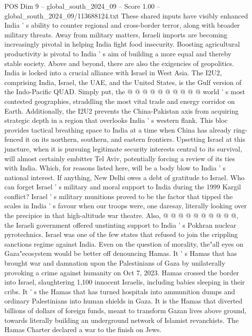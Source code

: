 \begin{textsample}{POS Dim 9 – global\_south\_2024\_09 – Score 1.00 – global\_south\_2024\_09/113688124.txt}
These shared inputs have visibly enhanced India ' s ability to counter regional and cross-border terror, along with broader military threats.
Away from military matters, Israeli imports are becoming increasingly pivotal in helping India fight food insecurity.
Boosting agricultural productivity is pivotal to India ' s aim of building a more equal and thereby stable society.
Above and beyond, there are also the exigencies of geopolitics.
India is locked into a crucial alliance with Israel in West Asia.
The I2U2, comprising India, Israel, the UAE, and the United States, is the Gulf version of the Indo-Pacific QUAD.
Simply put, the @ @ @ @ @ @ @ @ @ @ world ' s most contested geographies, straddling the most vital trade and energy corridor on Earth.
Additionally, the I2U2 prevents the China-Pakistan axis from acquiring strategic depth in a region that overlooks India ' s western flank.
This bloc provides tactical breathing space to India at a time when China has already ring-fenced it on its northern, southern, and eastern frontiers.
Upsetting Israel at this juncture, when it is pursuing legitimate security interests central to its survival, will almost certainly embitter Tel Aviv, potentially forcing a review of its ties with India.
Which, for reasons listed here, will be a body blow to India ' s national interest.
If anything, New Delhi owes a debt of gratitude to Israel.
Who can forget Israel ' s military and moral support to India during the 1999 Kargil conflict?
Israel ' s military munitions proved to be the factor that tipped the scales in India ' s favour when our troops were, one daresay, literally looking over the precipice in that high-altitude war theatre.
Also, @ @ @ @ @ @ @ @ @ @, the Israeli government offered unstinting support to India ' s Pokhran nuclear pyrotechnics.
Israel was one of the few states that refused to join the crippling sanctions regime against India.
Even on the question of morality, the"all eyes on Gaza"ecosystem would be better off denouncing Hamas.
It ' s Hamas that has brought war and damnation upon the Palestinians of Gaza by unilaterally provoking a crime against humanity on Oct 7, 2023.
Hamas crossed the border into Israel, slaughtering 1,100 innocent Israelis, including babies sleeping in their cribs.
It ' s the Hamas that has turned hospitals into ammunition dumps and ordinary Palestinians into human shields in Gaza.
It is the Hamas that diverted billions of dollars of foreign funds, meant to transform Gazan lives above ground, towards literally building an underground network of Islamist revanchists.
The Hamas Charter declared a war to the finish on Jews.

\end{textsample}
